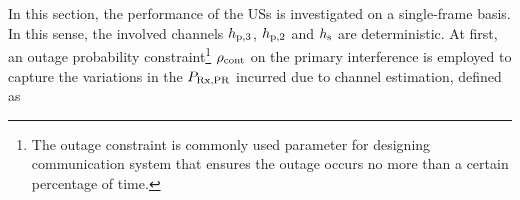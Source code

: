 In this section, the performance of the USs is investigated on a single-frame basis. In this sense, the involved channels $h_{\text{p,3}}$, $h_{\text{p,2}}$ and $h_{\text{s}}$ are deterministic.   
At first, an outage probability constraint\footnote{The outage constraint is commonly used parameter for designing communication system that ensures the outage occurs no more than a certain percentage of time.} $\rho_{\text{cont}}$ on the primary interference is employed to capture the variations in the $P_{\text{Rx,PR}}$ incurred due to channel estimation, defined as 
